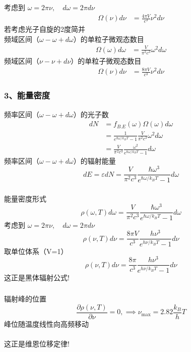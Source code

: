 \begin{frame}
  \frametitle{}
  考虑到 $\omega = 2 \pi \nu, \quad d \omega = 2 \pi d\nu $
\[ 
\begin{aligned}
  \Omega (\nu) d \nu 
  &= \frac{4\pi V}{c^3} \nu^2  d \nu
\end{aligned}
 \]
 若考虑光子自旋的2度简并\\
 频域区间（$\omega - \omega + d \omega$）的单粒子微观态数目
 \[ 
    \begin{aligned}
         \Omega (\omega) d \omega 
         &= \frac{V}{\pi ^2c^3} \omega^2  d \omega
       \end{aligned}
    \]
  频域区间（$\nu - \nu + d \nu$）的单粒子微观态数目
  \[ 
\begin{aligned}
  \Omega (\nu) d \nu 
  &= \frac{8\pi V}{c^3} \nu^2  d \nu
\end{aligned}
 \]
\end{frame} 

\begin{frame}
  \frametitle{ 3、能量密度}
  频率区间（$\omega - \omega + d \omega$）的光子数
\[ \begin{aligned} 
  dN &= f_{B.E} (\omega) \Omega (\omega) d \omega  \\
  &= \frac{1}{e^{\hbar \omega /k_B T}-1} \frac{V}{\pi ^2c^3} \omega^2  d \omega \\ 
  &=  \frac{V}{\pi ^2c^3} \frac{\omega^2}{e^{\hbar \omega /k_B T}-1} d \omega 
\end{aligned}\]
频率区间（$\omega - \omega + d \omega$）的辐射能量
\[ d E = \varepsilon dN = \frac{ V}{\pi ^2c^3} \frac{\hbar\omega^3}{e^{\hbar \omega /k_B T}-1} d \omega\]
\end{frame} 

\begin{frame}
  \frametitle{}
  能量密度形式
  \[ \rho(\omega, T) d \omega = \frac{ V}{\pi ^2c^3} \frac{\hbar\omega^3}{e^{\hbar \omega /k_B T}-1} d \omega\]
  考虑到 $\omega = 2 \pi \nu, \quad d \omega = 2 \pi d\nu $
  \begin{equation*}
    \rho(\nu, T) d \nu=\frac{8 \pi V}{c^{3}} \frac{h \nu^{3}}{e^{h \nu / k_B T}-1} d \nu
  \end{equation*}
  取单位体系（V=1）
  \begin{equation*}
    \rho(\nu, T) d \nu=\frac{8 \pi}{c^{3}} \frac{h \nu^{3}}{e^{h \nu / k_B T}-1} d \nu
  \end{equation*}
  这正是黑体辐射公式!
\end{frame} 

\begin{frame}
  \frametitle{}
  辐射峰的位置
  $$\frac{\partial \rho(\nu, T)}{\partial \nu }  = 0, \implies \nu _{\max } = 2.82 \frac{k_B}{h} T$$
  峰位随温度线性向高频移动\\
  ~~\\ 
  这正是维恩位移定律!
\end{frame} 

